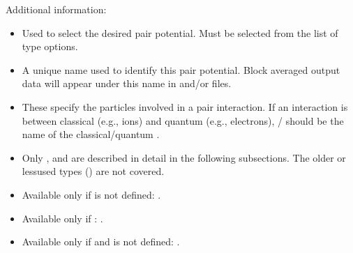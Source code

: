 \documentclass[letterpaper,10pt,english]{sphinxmanual}
\begin{document}
Additional information:
\begin{itemize}
\item {} 
 Used to select the desired pair potential. Must be selected
from the list of type options.

\item {} 
 A unique name used to identify this pair potential. Block
averaged output data will appear under this name in 
and/or  files.

\item {} 
 These specify the particles involved in a pair
interaction. If an interaction is between classical (e.g., ions) and
quantum (e.g., electrons), / should be the name
of the classical/quantum .

\item {} 
Only , and  are described in detail in the
following subsections. The older or less\sphinxhyphen{}used types ()
are not covered.

\item {} 
Available only if  is not defined: .

\item {} 
Available only if : .

\item {} 
Available only if  and  is not defined:
.

\end{itemize}
\end{document}
